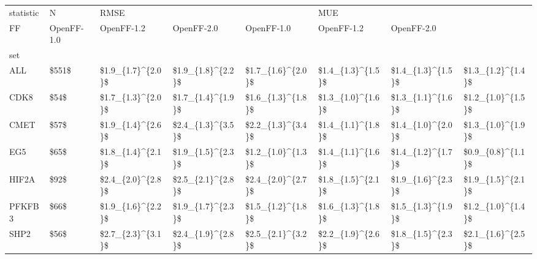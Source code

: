 \begin{tabular}{llllllll}
\toprule
statistic &      N & \multicolumn{3}{l}{RMSE} & \multicolumn{3}{l}{MUE} \\
FF &         OpenFF-1.0 &         OpenFF-1.2 &         OpenFF-2.0 &         OpenFF-1.0 &         OpenFF-1.2 &         OpenFF-2.0 \\
set    &        &                    &                    &                    &                    &                    &                    \\
\midrule
ALL    &  \$551\$ &  \$1.9\_\{1.7\}\textasciicircum \{2.0\}\$ &  \$1.9\_\{1.8\}\textasciicircum \{2.2\}\$ &  \$1.7\_\{1.6\}\textasciicircum \{2.0\}\$ &  \$1.4\_\{1.3\}\textasciicircum \{1.5\}\$ &  \$1.4\_\{1.3\}\textasciicircum \{1.5\}\$ &  \$1.3\_\{1.2\}\textasciicircum \{1.4\}\$ \\
CDK8   &   \$54\$ &  \$1.7\_\{1.3\}\textasciicircum \{2.0\}\$ &  \$1.7\_\{1.4\}\textasciicircum \{1.9\}\$ &  \$1.6\_\{1.3\}\textasciicircum \{1.8\}\$ &  \$1.3\_\{1.0\}\textasciicircum \{1.6\}\$ &  \$1.3\_\{1.1\}\textasciicircum \{1.6\}\$ &  \$1.2\_\{1.0\}\textasciicircum \{1.5\}\$ \\
CMET   &   \$57\$ &  \$1.9\_\{1.4\}\textasciicircum \{2.6\}\$ &  \$2.4\_\{1.3\}\textasciicircum \{3.5\}\$ &  \$2.2\_\{1.3\}\textasciicircum \{3.4\}\$ &  \$1.4\_\{1.1\}\textasciicircum \{1.8\}\$ &  \$1.4\_\{1.0\}\textasciicircum \{2.0\}\$ &  \$1.3\_\{1.0\}\textasciicircum \{1.9\}\$ \\
EG5    &   \$65\$ &  \$1.8\_\{1.4\}\textasciicircum \{2.1\}\$ &  \$1.9\_\{1.5\}\textasciicircum \{2.3\}\$ &  \$1.2\_\{1.0\}\textasciicircum \{1.3\}\$ &  \$1.4\_\{1.1\}\textasciicircum \{1.6\}\$ &  \$1.4\_\{1.2\}\textasciicircum \{1.7\}\$ &  \$0.9\_\{0.8\}\textasciicircum \{1.1\}\$ \\
HIF2A  &   \$92\$ &  \$2.4\_\{2.0\}\textasciicircum \{2.8\}\$ &  \$2.5\_\{2.1\}\textasciicircum \{2.8\}\$ &  \$2.4\_\{2.0\}\textasciicircum \{2.7\}\$ &  \$1.8\_\{1.5\}\textasciicircum \{2.1\}\$ &  \$1.9\_\{1.6\}\textasciicircum \{2.3\}\$ &  \$1.9\_\{1.5\}\textasciicircum \{2.1\}\$ \\
PFKFB3 &   \$66\$ &  \$1.9\_\{1.6\}\textasciicircum \{2.2\}\$ &  \$1.9\_\{1.7\}\textasciicircum \{2.3\}\$ &  \$1.5\_\{1.2\}\textasciicircum \{1.8\}\$ &  \$1.6\_\{1.3\}\textasciicircum \{1.8\}\$ &  \$1.5\_\{1.3\}\textasciicircum \{1.9\}\$ &  \$1.2\_\{1.0\}\textasciicircum \{1.4\}\$ \\
SHP2   &   \$56\$ &  \$2.7\_\{2.3\}\textasciicircum \{3.1\}\$ &  \$2.4\_\{1.9\}\textasciicircum \{2.8\}\$ &  \$2.5\_\{2.1\}\textasciicircum \{3.2\}\$ &  \$2.2\_\{1.9\}\textasciicircum \{2.6\}\$ &  \$1.8\_\{1.5\}\textasciicircum \{2.3\}\$ &  \$2.1\_\{1.6\}\textasciicircum \{2.5\}\$ \\

\end{tabular}
